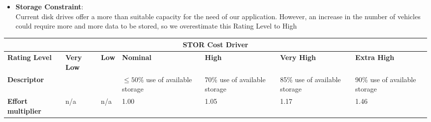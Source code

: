 \begin{itemize}
\item \textbf{Storage Constraint}: \\Current disk drives offer a more than suitable capacity for the need of our application. However, an increase in the number of vehicles could require more and more data to be stored, so we overestimate this Rating Level to High
\end{itemize}
\hspace*{-3cm}\begin{tabular}{|p{3cm}|p{2cm}|p{2cm}|p{2cm}|p{2cm}|p{2cm}|p{2cm}|}
\hline
\multicolumn{7}{|c|}{\textbf{STOR Cost Driver}}\\
\hline
\hline
\textbf{Rating Level} & \textbf{Very Low} & \textbf{Low} & \textbf{Nominal} & \textbf{High} & \textbf{Very High} & \textbf{Extra High}\\
\hline
\textbf{Descriptor} &  &  & $\leq 50 \%$ use of available storage & 70\% use of available storage & 85\% use of available storage& 90\% use of available storage\\
\hline
\textbf{Effort multiplier} & n/a & n/a & 1.00 & 1.05 & 1.17 & 1.46\\
\hline 
\end{tabular}